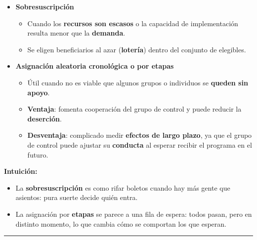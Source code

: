 \documentclass[12pt]{article}
\begin{document}
\begin{itemize}
    \item \textbf{Sobresuscripción}
    \begin{itemize}
        \item Cuando los \textbf{recursos son escasos} o la capacidad de implementación resulta menor que la \textbf{demanda}.
        \item Se eligen beneficiarios al azar (\textbf{lotería}) dentro del conjunto de elegibles.
    \end{itemize}

    \item \textbf{Asignación aleatoria cronológica o por etapas}
    \begin{itemize}
        \item Útil cuando no es viable que algunos grupos o individuos se \textbf{queden sin apoyo}.
        \item \textbf{Ventaja}: fomenta cooperación del grupo de control y puede reducir la \textbf{deserción}.
        \item \textbf{Desventaja}: complicado medir \textbf{efectos de largo plazo}, ya que el grupo de control puede ajustar su \textbf{conducta} al esperar recibir el programa en el futuro.
    \end{itemize}
\end{itemize}

\textbf{Intuición:}
\begin{itemize}
    \item La \textbf{sobresuscripción} es como rifar boletos cuando hay más gente que asientos: pura suerte decide quién entra.
    \item La asignación por \textbf{etapas} se parece a una fila de espera: todos pasan, pero en distinto momento, lo que cambia cómo se comportan los que esperan.
\end{itemize}
\hrule
\end{document}
